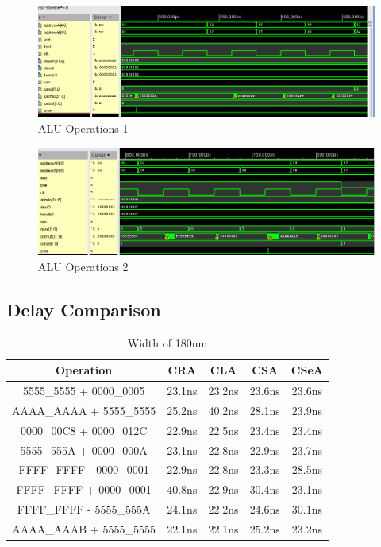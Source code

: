\documentclass[12pt]{article}
\begin{document}
\begin{figure}[H]
\centering
\includegraphics[width=\linewidth]{../CSeA/alu1}
\caption{ALU Operations 1}
\label{fig:alu1-CSeA}
\end{figure}
\begin{figure}[H]
\centering
\includegraphics[width=\linewidth]{../CSeA/alu2}
\caption{ALU Operations 2}
\label{fig:alu2-CSeA}
\end{figure}

\subsection{Delay Comparison}

\begin{table}[H]
	\begin{center}
		\begin{tabular}{ |c|c|c|c|c| }
			\hline
			Operation & CRA & CLA & CSA & CSeA \\

			\hline
			5555\_5555 + 0000\_0005 & 23.1ns & 23.2ns & 23.6ns & 23.6ns \\
			\hline
			AAAA\_AAAA + 5555\_5555 & 25.2ns & 40.2ns& 28.1ns& 23.9ns \\
			\hline
			0000\_00C8 + 0000\_012C & 22.9ns & 22.5ns &  23.4ns& 23.4ns \\
			\hline
			5555\_555A + 0000\_000A & 23.1ns & 22.8ns & 22.9ns & 23.7ns \\
			\hline
			FFFF\_FFFF - 0000\_0001 & 22.9ns & 22.8ns & 23.3ns & 28.5ns \\
			\hline
			FFFF\_FFFF + 0000\_0001 & 40.8ns & 22.9ns & 30.4ns & 23.1ns \\
			\hline
			FFFF\_FFFF - 5555\_555A & 24.1ns & 22.2ns & 24.6ns & 30.1ns \\
			\hline
			AAAA\_AAAB + 5555\_5555 & 22.1ns & 22.1ns & 25.2ns & 23.2ns \\
			\hline
		\end{tabular}
	\end{center}
	\caption{Width of 180nm}
	\label{tab:2nd}
\end{table}
\end{document}
